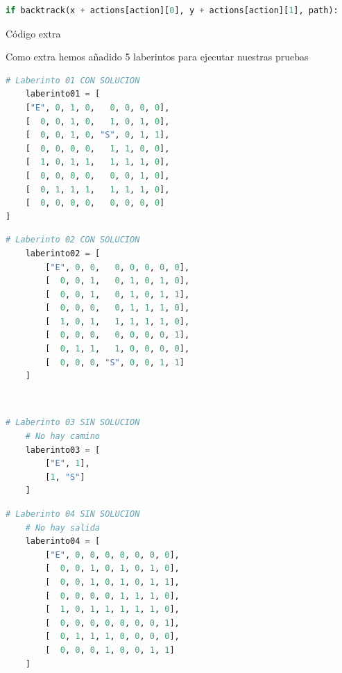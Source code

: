 \documentclass[a4paper,12pt]{article}
\begin{document}
\begin{lstlisting}[style=mystylepython, language=Python, caption= algoritmo backtracking]
    if backtrack(x + actions[action][0], y + actions[action][1], path):
\end{lstlisting}


\begin{center}
    \Large{Código extra}
\end{center}

Como extra hemos añadido 5 laberintos para ejecutar nuestras pruebas

\begin{minipage}[t]{8.2cm}
\begin{lstlisting}[style=mystylepython, language=Python, caption= laberinto01]
    # Laberinto 01 CON SOLUCION
    laberinto01 = [
    ["E", 0, 1, 0,   0, 0, 0, 0],
    [  0, 0, 1, 0,   1, 0, 1, 0],
    [  0, 0, 1, 0, "S", 0, 1, 1],
    [  0, 0, 0, 0,   1, 1, 0, 0],
    [  1, 0, 1, 1,   1, 1, 1, 0],
    [  0, 0, 0, 0,   0, 0, 1, 0],
    [  0, 1, 1, 1,   1, 1, 1, 0],
    [  0, 0, 0, 0,   0, 0, 0, 0]
]
\end{lstlisting}
\end{minipage}
\hspace{9mm}
\begin{minipage}[t]{8.2cm}
\begin{lstlisting}[style=mystylepython, language=Python, caption= laberinto02]
    # Laberinto 02 CON SOLUCION
    laberinto02 = [
        ["E", 0, 0,   0, 0, 0, 0, 0],
        [  0, 0, 1,   0, 1, 0, 1, 0],
        [  0, 0, 1,   0, 1, 0, 1, 1],
        [  0, 0, 0,   0, 1, 1, 1, 0],
        [  1, 0, 1,   1, 1, 1, 1, 0],
        [  0, 0, 0,   0, 0, 0, 0, 1],
        [  0, 1, 1,   1, 0, 0, 0, 0],
        [  0, 0, 0, "S", 0, 0, 1, 1]
    ]
\end{lstlisting}
\end{minipage} \\

\begin{minipage}[t]{8.2cm}
\begin{lstlisting}[style=mystylepython, language=Python, caption= laberinto03]
    # Laberinto 03 SIN SOLUCION
    # No hay camino
    laberinto03 = [
        ["E", 1],
        [1, "S"]
    ]    
\end{lstlisting}
\end{minipage}
\hspace{9mm}
\begin{minipage}[t]{8.2cm}
\begin{lstlisting}[style=mystylepython, language=Python, caption= laberinto04]
    # Laberinto 04 SIN SOLUCION
    # No hay salida
    laberinto04 = [
        ["E", 0, 0, 0, 0, 0, 0, 0],
        [  0, 0, 1, 0, 1, 0, 1, 0],
        [  0, 0, 1, 0, 1, 0, 1, 1],
        [  0, 0, 0, 0, 1, 1, 1, 0],
        [  1, 0, 1, 1, 1, 1, 1, 0],
        [  0, 0, 0, 0, 0, 0, 0, 1],
        [  0, 1, 1, 1, 0, 0, 0, 0],
        [  0, 0, 0, 1, 0, 0, 1, 1]
    ]
\end{lstlisting}
\end{minipage} \\ 
\end{document}
